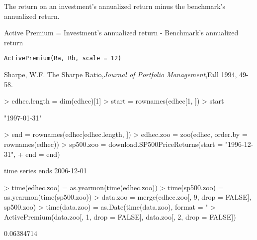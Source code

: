 \documentclass[12pt,letterpaper,english]{article}
\begin{document}
\begin{Description}\relax
The return on an investment's annualized return minus the benchmark's annualized return.

Active Premium = Investment's annualized return - Benchmark's annualized return
\end{Description}
\begin{Usage}
\begin{verbatim}
ActivePremium(Ra, Rb, scale = 12)
\end{verbatim}
\end{Usage}
\begin{References}\relax
Sharpe, W.F. The Sharpe Ratio,\emph{Journal of Portfolio Management},Fall 1994, 49-58.
\end{References}


\begin{Examples}
\begin{Schunk}
\begin{Sinput}
> edhec.length = dim(edhec)[1]
> start = rownames(edhec[1, ])
> start
\end{Sinput}
\begin{Soutput}
[1] "1997-01-31"
\end{Soutput}
\begin{Sinput}
> end = rownames(edhec[edhec.length, ])
> edhec.zoo = zoo(edhec, order.by = rownames(edhec))
> sp500.zoo = download.SP500PriceReturns(start = "1996-12-31", 
+     end = end)
\end{Sinput}
\begin{Soutput}
time series ends   2006-12-01
\end{Soutput}
\begin{Sinput}
> time(edhec.zoo) = as.yearmon(time(edhec.zoo))
> time(sp500.zoo) = as.yearmon(time(sp500.zoo))
> data.zoo = merge(edhec.zoo[, 9, drop = FALSE], sp500.zoo)
> time(data.zoo) = as.Date(time(data.zoo), format = "%b %Y")
> ActivePremium(data.zoo[, 1, drop = FALSE], data.zoo[, 2, drop = FALSE])
\end{Sinput}
\begin{Soutput}
[1] 0.06384714
\end{Soutput}
\end{Schunk}
\end{Examples}
\end{document}

